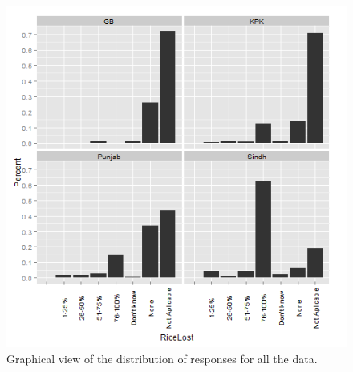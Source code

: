\begin{figure}[!hbtp]
\begin{knitrout}
\begin{kframe}
\end{kframe}\includegraphics[width=.9\linewidth]{writeup/overall/figuresoverallDist} 
\end{knitrout}

\caption{Graphical view of the distribution of responses for all the data.\label{fig:allDist}}
\end{figure}

